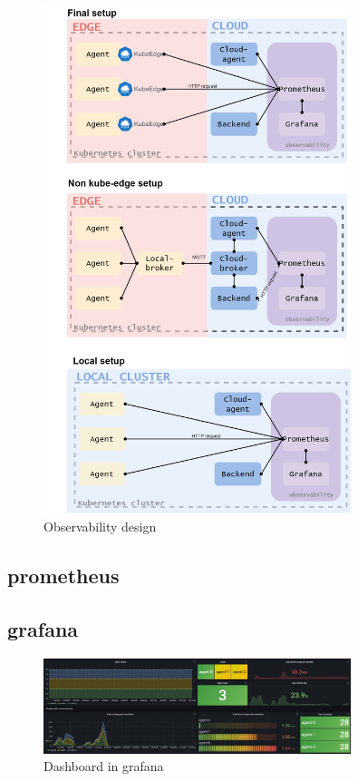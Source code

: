 \begin{figure}[H]
    \centering
    \includegraphics[width=0.8\textwidth]{pictures/observability.png}
    \caption{ Observability design }
    \label{fig:observability_system}
\end{figure}

\subsection{prometheus}
\subsection{grafana}
\begin{figure}[H]
    \centering
    \includegraphics[width=0.8\textwidth]{pictures/grafana.png}
    \caption{ Dashboard in grafana }
    \label{fig:dashboard_grafana}
\end{figure}
